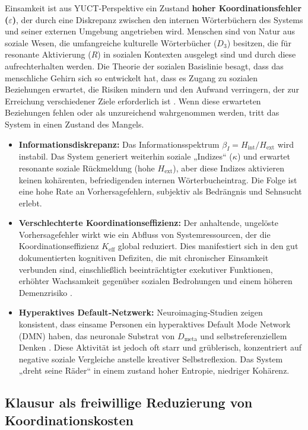 \documentclass[12pt,a4paper]{article}
\begin{document}
	Einsamkeit ist aus YUCT‑Perspektive ein Zustand \textbf{hoher Koordinationsfehler (\(\varepsilon\))}, der durch eine Diskrepanz zwischen den internen Wörterbüchern des Systems und seiner externen Umgebung angetrieben wird. Menschen sind von Natur aus soziale Wesen, die umfangreiche kulturelle Wörterbücher (\(D_3\)) besitzen, die für resonante Aktivierung (\(R\)) in sozialen Kontexten ausgelegt sind und durch diese aufrechterhalten werden. Die Theorie der sozialen Basislinie besagt, dass das menschliche Gehirn sich so entwickelt hat, dass es Zugang zu sozialen Beziehungen erwartet, die Risiken mindern und den Aufwand verringern, der zur Erreichung verschiedener Ziele erforderlich ist \cite{Beckes2015}. Wenn diese erwarteten Beziehungen fehlen oder als unzureichend wahrgenommen werden, tritt das System in einen Zustand des Mangels.
	
	\begin{itemize}
		\item \textbf{Informationsdiskrepanz:} Das Informationsspektrum \(\beta_I = H_{\mathrm{int}}/H_{\mathrm{ext}}\) wird instabil. Das System generiert weiterhin soziale „Indizes“ (\(\kappa\)) und erwartet resonante soziale Rückmeldung (hohe \(H_{\mathrm{ext}}\)), aber diese Indizes aktivieren keinen kohärenten, befriedigenden internen Wörterbucheintrag. Die Folge ist eine hohe Rate an Vorhersagefehlern, subjektiv als Bedrängnis und Sehnsucht erlebt.
		\item \textbf{Verschlechterte Koordinationseffizienz:} Der anhaltende, ungelöste Vorhersagefehler wirkt wie ein Abfluss von Systemressourcen, der die Koordinationseffizienz \(K_{\mathrm{eff}}\) global reduziert. Dies manifestiert sich in den gut dokumentierten kognitiven Defiziten, die mit chronischer Einsamkeit verbunden sind, einschließlich beeinträchtigter exekutiver Funktionen, erhöhter Wachsamkeit gegenüber sozialen Bedrohungen und einem höheren Demenzrisiko \cite{Finley2025}.
		\item \textbf{Hyperaktives Default‑Netzwerk:} Neuroimaging‑Studien zeigen konsistent, dass einsame Personen ein hyperaktives Default Mode Network (DMN) haben, das neuronale Substrat von \(D_{\text{meta}}\) und selbstreferenziellem Denken \cite{Spreng2020}. Diese Aktivität ist jedoch oft starr und grüblerisch, konzentriert auf negative soziale Vergleiche anstelle kreativer Selbstreflexion. Das System „dreht seine Räder“ in einem zustand hoher Entropie, niedriger Kohärenz.
	\end{itemize}
	
	\subsection{Klausur als freiwillige Reduzierung von Koordinationskosten}
	
\end{document}
